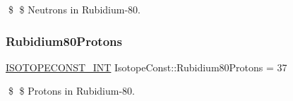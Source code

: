 \$ \$ Neutrons in Rubidium-\/80. \mbox{\label{group___isotope_const-_rubidium-_rb80_ga4d3ceafef15028b3632022e0a966a113}} 
\subsubsection{\texorpdfstring{Rubidium80\+Protons}{Rubidium80Protons}}
{\footnotesize\ttfamily \mbox{\hyperlink{group___isotope_const-_macros_ga5f18360b3e99483a35c32d789e62621c}{I\+S\+O\+T\+O\+P\+E\+C\+O\+N\+S\+T\+\_\+\+I\+NT}} Isotope\+Const\+::\+Rubidium80\+Protons = 37}

\$ \$ Protons in Rubidium-\/80. 